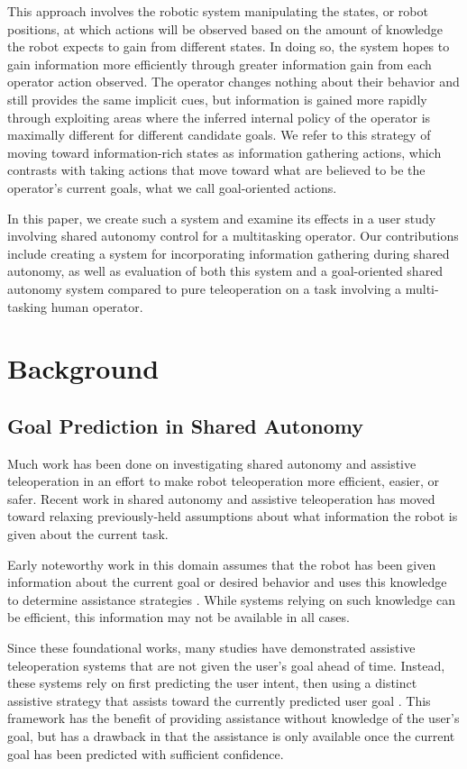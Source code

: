\documentclass[conference]{IEEEtran}
\begin{document}
This approach involves the robotic system manipulating the states, or robot positions, at which actions will be observed based on the amount of knowledge the robot expects to gain from different states. In doing so, the system hopes to gain information more efficiently through greater information gain from each operator action observed. The operator changes nothing about their behavior and still provides the same implicit cues, but information is gained more rapidly through exploiting areas where the inferred internal policy of the operator is maximally different for different candidate goals. We refer to this strategy of moving toward information-rich states as information gathering actions, which contrasts with taking actions that move toward what are believed to be the operator's current goals, what we call goal-oriented actions. 

In this paper, we create such a system and examine its effects in a user study involving shared autonomy control for a multitasking operator. Our contributions include creating a system for incorporating information gathering during shared autonomy, as well as evaluation of both this system and a goal-oriented shared autonomy system compared to pure teleoperation on a task involving a multi-tasking human operator.

\section{Background}
\subsection{Goal Prediction in Shared Autonomy}

Much work has been done on investigating shared autonomy and assistive teleoperation in an effort to make robot teleoperation more efficient, easier, or safer. Recent work in shared autonomy and assistive teleoperation has moved toward relaxing previously-held assumptions about what information the robot is given about the current task. 

Early noteworthy work in this domain assumes that the robot has been given information about the current goal or desired behavior and uses this knowledge to determine assistance strategies \cite{aigner1997human, debus2001cooperative, goodrich2001experiments}. While systems relying on such knowledge can be efficient, this information may not be available in all cases.

Since these foundational works, many studies have demonstrated assistive teleoperation systems that are not given the user's goal ahead of time. Instead, these systems rely on first predicting the user intent, then using a distinct assistive strategy that assists toward the currently predicted user goal \cite{dragan2012formalizing, fagg2004extracting, kragic2005human, schultz2017goal, yu2005telemanipulation}. This framework has the benefit of providing assistance without knowledge of the user's goal, but has a drawback in that the assistance is only available once the current goal has been predicted with sufficient confidence. 
\end{document}
